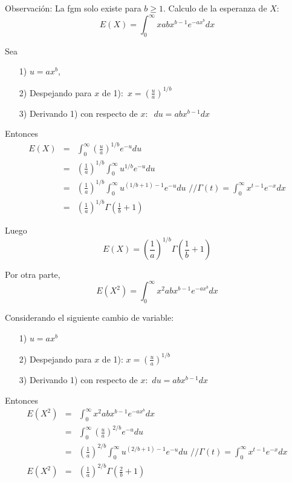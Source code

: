 \begin{i}
Observación: La fgm solo existe para $b\geq 1$.
Calculo de la esperanza de $X$: 
\begin{equation*}
E(X)=\int_{0}^{\infty }xabx^{b-1}e^{-ax^{b}}dx
\end{equation*}

Sea
\begin{enumerate}
\item[1)] $u=ax^{b}$, \ 
\item[2)] Despejando para $x$ de 1):\ $x=\left( \frac{u}{a}\right) ^{1/b}$
\item[3)] Derivando 1) con respecto de $x:$ $\ du=abx^{b-1}dx$
\end{enumerate}

Entonces
\begin{eqnarray*}
E(X) &=&\int_{0}^{\infty }\left( \frac{u}{a}\right) ^{1/b}e^{-u}du \\
&=&\left( \frac{1}{a}\right) ^{1/b}\int_{0}^{\infty }u^{1/b}e^{-u}du \\
&=&\left( \frac{1}{a}\right) ^{1/b}\int_{0}^{\infty }u^{(1/b+1)-1}e^{-u}du
\text{ \ \ //}\Gamma (t)=\int_{0}^{\infty }x^{t-1}e^{-x}dx \\
&=&\left( \frac{1}{a}\right) ^{1/b}\Gamma \left( \frac{1}{b}+1\right)
\end{eqnarray*}

Luego 
\begin{equation*}
E(X)=\left( \frac{1}{a}\right) ^{1/b}\Gamma \left( \frac{1}{b}+1\right)
\end{equation*}

Por otra parte,
\begin{equation*}
E(X^{2})=\int_{0}^{\infty }x^{2}abx^{b-1}e^{-ax^{b}}dx
\end{equation*}

Considerando el siguiente cambio de variable:
\begin{enumerate}
\item[1)] $u=ax^{b}$

\item[2)] Despejando para $x$ de 1): $x=\left( \frac{u}{a}\right) ^{1/b}$

\item[3)] Derivando 1) con respecto de $x:$ $du=abx^{b-1}dx$
\end{enumerate}


Entonces 
\begin{eqnarray*}
E(X^{2}) &=&\int_{0}^{\infty }x^{2}abx^{b-1}e^{-ax^{b}}dx \\
&=&\int_{0}^{\infty }\left( \frac{u}{a}\right) ^{2/b}e^{-u}du \\
&=&\left( \frac{1}{a}\right) ^{2/b}\int_{0}^{\infty }u^{(2/b+1)-1}e^{-u}du
\text{ \ \ \ //}\Gamma (t)=\int_{0}^{\infty }x^{t-1}e^{-x}dx \\
E(X^{2}) &=&\left( \frac{1}{a}\right) ^{2/b}\Gamma \left( \frac{2}{b}
+1\right)
\end{eqnarray*}


\end{i}
